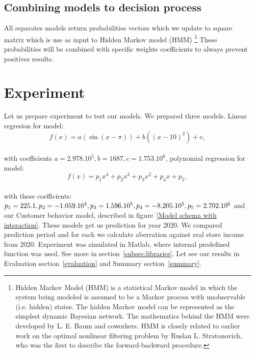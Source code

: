 \subsection{Combining models to decision process} \label{subsec:combining_models}
All separates models return probabilities vectors which we update to square matrix which is use as input to Hidden Markov model (HMM) \footnote{Hidden Markov Model (HMM) is a statistical Markov model
in which the system being modeled is assumed to be a Markov process with unobservable (i.e. hidden) states.
The hidden Markov model can be represented as the simplest dynamic Bayesian network.
The mathematics behind the HMM were developed by L. E. Baum and coworkers.
HMM is closely related to earlier work on the optimal nonlinear filtering problem by Ruslan L. Stratonovich,
who was the first to describe the forward-backward procedure.}
These probabilities will be combined with specific weights coefficients to always prevent positives results.
\\
\section{Experiment} \label{experiment}
Let us prepare experiment to test our models. We prepared three models.
Linear regresion for model:\\
\begin{equation} \label{eq:40}
f(x) = a(\sin(x-\pi))+b((x-10)^2)+c,
\end{equation}\\
with coefficients $a =2.978.10^5,b =1687,c = 1.753.10^6$, polynomial regression for model:\\
\begin{equation} \label{eq:41}
f(x) = p_1x^4 + p_2x^3 + p_3x^2 + p_4x + p_5,
\end{equation}\\
with these coefficients: $p_1 = 225.1, p_2 = -1.059.10^4, p_3 =1.596.10^5,\\
p_4 = -8.205.10^5, p_5 = 2.702.10^6$ and our Customer behavior model, described in figure~\ref{Model schema with interaction}.
These models get us prediction for year 2020.
We compared prediction period  and  for each we calculate aberration against real store income from 2020.
Experiment was simulated in Matlab, where internal predefined function was used. See more in section~\ref{subsec:libraries}.
Let see our results in Evaluation section~\ref{evaluation} and Summary section~\ref{summary}.\\
